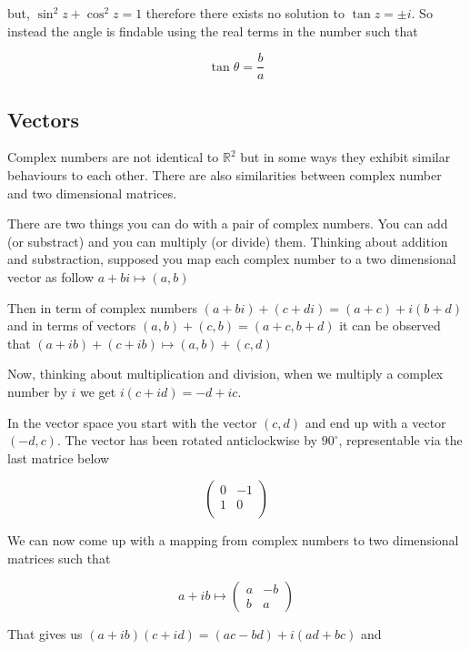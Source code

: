 \documentclass[12pt]{article}
\newcommand{\R}{{\mathbb{R}}}
\begin{document}
    but, $\sin^2 z + \cos^2 z = 1$ therefore there exists no solution to $\tan z = \pm i$. So instead
    the angle is findable using the real terms in the number such that 

    \[
        \tan\theta = \frac{b}{a}   
    \]

    \subsection{Vectors}

    Complex numbers are not identical to $\R^2$ but in some ways they 
    exhibit similar behaviours to each other. There are also similarities between complex
    number and two dimensional matrices. 

    There are two things you can do with a pair of complex numbers. You can add (or substract)
    and you can multiply (or divide) them. Thinking about addition and substraction, supposed 
    you map each complex number to a two dimensional vector as follow $a + bi \mapsto (a, b)$

    Then in term of complex numbers $(a + bi) + (c + di) = (a + c) + i(b + d)$ and in terms of vectors
    $(a, b) + (c, b) = (a + c, b + d)$ it can be observed that $(a + ib) + (c + ib) \mapsto (a, b) + (c, d)$   
    
    \newpage

    Now, thinking about multiplication and division, when we multiply a complex number by $i$ we
    get $i(c + id) = -d + ic$. 
    
    In the vector space you start with the vector $(c, d)$ and end up with a 
    vector $(-d, c)$. The vector has been rotated anticlockwise by $90^{\circ}$, representable via 
    the last matrice below
    
    \[
        \begin{pmatrix}
            0 & -1 \\
            1 & 0 \\
        \end{pmatrix}    
    \]

    We can now come up with a mapping from complex numbers to two dimensional matrices such that

    \[
        a + ib \mapsto \begin{pmatrix}
            a & -b \\
            b & a
        \end{pmatrix}
    \]

    That gives us $(a + ib)(c + id) = (ac - bd) + i(ad + bc)$ and
\end{document}
